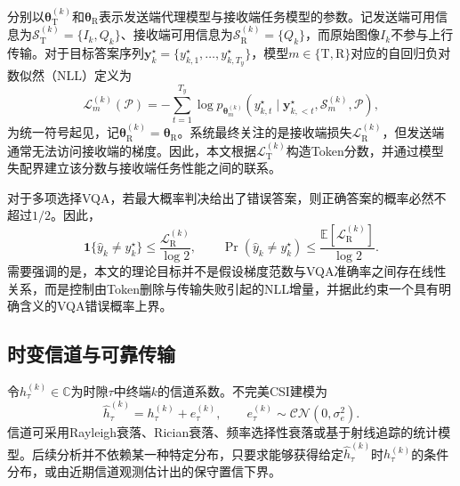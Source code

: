 \documentclass[journal]{IEEEtran}
\begin{document}
分别以$\bm\theta_{\mathrm T}^{(k)}$和$\bm\theta_{\mathrm R}$表示发送端代理模型与接收端任务模型的参数。记发送端可用信息为$\mathcal S_{\mathrm T}^{(k)}=\{I_k,Q_k\}$、接收端可用信息为$\mathcal S_{\mathrm R}^{(k)}=\{Q_k\}$，而原始图像$I_k$不参与上行传输。对于目标答案序列$\bm y_k^\star=\{y_{k,1}^\star,\ldots,y_{k,T_y}^\star\}$，模型$m\in\{\mathrm T,\mathrm R\}$对应的自回归负对数似然（NLL）定义为
\begin{equation}
\mathcal L_m^{(k)}(\mathcal P)
=-
\sum_{t=1}^{T_y}
\log p_{\bm\theta_m^{(k)}}
\!\left(
y_{k,t}^\star\mid \bm y_{k,<t}^\star,\mathcal S_m^{(k)},\mathcal P
\right),
\label{eq:task_loss}
\end{equation}
为统一符号起见，记$\bm\theta_{\mathrm R}^{(k)}=\bm\theta_{\mathrm R}$。系统最终关注的是接收端损失$\mathcal L_{\mathrm R}^{(k)}$，但发送端通常无法访问接收端的梯度。因此，本文根据$\mathcal L_{\mathrm T}^{(k)}$构造Token分数，并通过模型失配界建立该分数与接收端任务性能之间的联系。

对于多项选择VQA，若最大概率判决给出了错误答案，则正确答案的概率必然不超过$1/2$。因此，
\begin{equation}
\mathbf 1\{\widehat y_k\neq y_k^\star\}
\leq \frac{\mathcal L_{\mathrm R}^{(k)}}{\log 2},
\qquad
\Pr(\widehat y_k\neq y_k^\star)
\leq \frac{\mathbb E[\mathcal L_{\mathrm R}^{(k)}]}{\log 2}.
\label{eq:vqa_error_bound}
\end{equation}
需要强调的是，本文的理论目标并不是假设梯度范数与VQA准确率之间存在线性关系，而是控制由Token删除与传输失败引起的NLL增量，并据此约束一个具有明确含义的VQA错误概率上界。

\subsection{时变信道与可靠传输}

令$h_{\tau}^{(k)}\in\mathbb C$为时隙$\tau$中终端$k$的信道系数。不完美CSI建模为
\begin{equation}
\widehat h_{\tau}^{(k)}=h_{\tau}^{(k)}+e_{\tau}^{(k)},
\qquad
e_{\tau}^{(k)}\sim\mathcal{CN}(0,\sigma_e^2).
\label{eq:csi}
\end{equation}
信道可采用Rayleigh衰落、Rician衰落、频率选择性衰落或基于射线追踪的统计模型。后续分析并不依赖某一种特定分布，只要求能够获得给定$\widehat h_{\tau}^{(k)}$时$h_{\tau}^{(k)}$的条件分布，或由近期信道观测估计出的保守置信下界。
\end{document}

